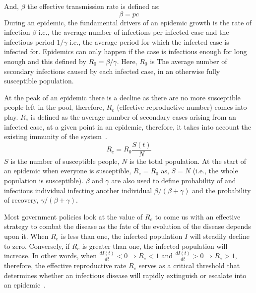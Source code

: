 \documentclass[tikz,fleqn,12pt]{wlscirep}
\begin{document}
And, $\beta$ the effective transmission rate is defined as:
\begin{equation}
  \beta = p c
  \label{eq:beta_effective_transmission_rate}
\end{equation}
During an epidemic, the fundamental drivers of an epidemic growth is the rate of infection $\beta$ i.e., the average number of infections per infected case and the infectious period $1/\gamma$ i.e., the average period for which the infected case is infected for. Epidemics can only happen if the case is infectious enough for long enough and this defined by $R_0 = \beta / \gamma$. Here, $R_0$ is The average number of secondary infections caused by each infected case, in an otherwise fully susceptible population.

At the peak of an epidemic there is a decline as there are no more susceptible people left in the pool, therefore, $R_e$ (effective reproductive number) comes into play. $R_e$ is defined as the average number of secondary cases arising from an infected case, at a given point in an epidemic, therefore, it takes into account the existing immunity of the system~\cite{MASSAD2017232}. 
\begin{equation}
  R_e = R_0 \frac{S(t)}{N}
  \label{eq:R_effective}
\end{equation}
$S$ is the number of susceptible people, $N$ is the total population. At the start of an epidemic when everyone is susceptible, $R_e = R_0$ as, $S = N$ (i.e., the whole population is susceptible). $\beta$ and $\gamma$ are also used to define probability of and infectious individual infecting another individual $\beta / (\beta + \gamma)$ and the probability of recovery, $\gamma / (\beta + \gamma)$.

Most government policies look at the value of $R_e$ to come us with an effective strategy to combat the disease as the fate of the evolution of the disease depends upon it. When $R_e$ is less than one, the infected population $I$ will steadily decline to zero. Conversely, if $R_e$ is greater than one, the infected population will increase. In other words, when $\frac{dI(t)}{dt} < 0 \Rightarrow R_e < 1$ and $\frac{dI(t)}{dt} > 0 \Rightarrow R_e > 1$, therefore, the effective reproductive rate $R_e$ serves as a critical threshold that determines whether an infectious disease will rapidly extinguish or escalate into an epidemic~\cite{Cooper2020}.
\end{document}
